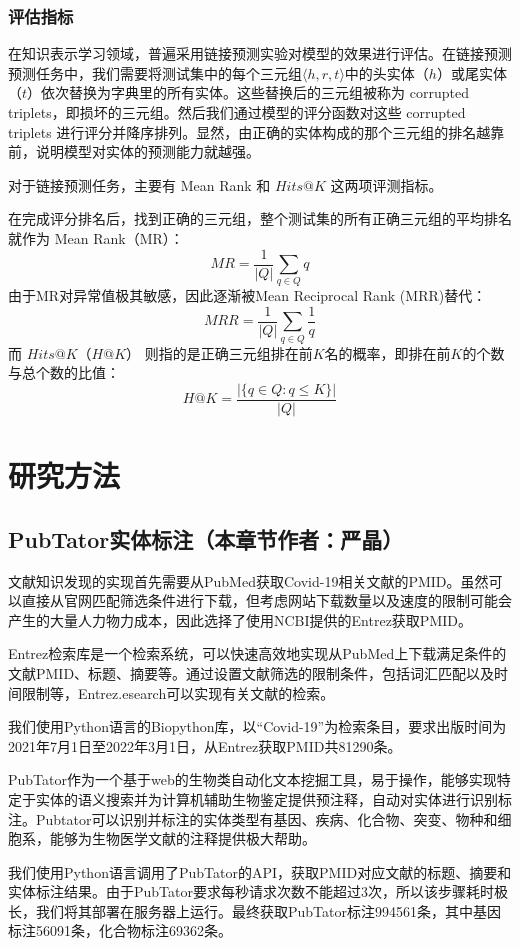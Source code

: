 \documentclass[twocolumn]{article}
\begin{document}
\subsubsection{评估指标}
在知识表示学习领域，普遍采用链接预测实验对模型的效果进行评估。在链接预测预测任务中，我们需要将测试集中的每个三元组$\langle h, r, t\rangle$中的头实体（$h$）或尾实体（$t$）依次替换为字典里的所有实体。这些替换后的三元组被称为 corrupted triplets，即损坏的三元组。然后我们通过模型的评分函数对这些 corrupted triplets 进行评分并降序排列。显然，由正确的实体构成的那个三元组的排名越靠前，说明模型对实体的预测能力就越强。\par
对于链接预测任务，主要有 Mean Rank 和 $Hits@K$ 这两项评测指标。\par
在完成评分排名后，找到正确的三元组，整个测试集的所有正确三元组的平均排名就作为 Mean Rank（MR）：
$$MR=\frac{1}{|Q|} \sum_{q \in Q} q$$
由于MR对异常值极其敏感，因此逐渐被Mean Reciprocal Rank (MRR)替代：
$$MRR=\frac{1}{|Q|} \sum_{q \in Q} \frac{1}{q}$$
而 $Hits@K$（$H@K$） 则指的是正确三元组排在前$K$名的概率，即排在前$K$的个数与总个数的比值：
$$H @ K=\frac{|\{q \in Q: q \leq K\}|}{|Q|}$$


\section{研究方法}

\subsection{PubTator实体标注（本章节作者：严晶）\label{data_access}}
文献知识发现的实现首先需要从PubMed获取Covid-19相关文献的PMID。虽然可以直接从官网匹配筛选条件进行下载，但考虑网站下载数量以及速度的限制可能会产生的大量人力物力成本，因此选择了使用NCBI提供的Entrez获取PMID。\par
Entrez检索库是一个检索系统，可以快速高效地实现从PubMed上下载满足条件的文献PMID、标题、摘要等。通过设置文献筛选的限制条件，包括词汇匹配以及时间限制等，Entrez.esearch可以实现有关文献的检索。\par
我们使用Python语言的Biopython库，以“Covid-19”为检索条目，要求出版时间为2021年7月1日至2022年3月1日，从Entrez获取PMID共81290条。\par
PubTator作为一个基于web的生物类自动化文本挖掘工具，易于操作，能够实现特定于实体的语义搜索并为计算机辅助生物鉴定提供预注释，自动对实体进行识别标注。Pubtator可以识别并标注的实体类型有基因、疾病、化合物、突变、物种和细胞系，能够为生物医学文献的注释提供极大帮助。\par
我们使用Python语言调用了PubTator的API，获取PMID对应文献的标题、摘要和实体标注结果。由于PubTator要求每秒请求次数不能超过3次，所以该步骤耗时极长，我们将其部署在服务器上运行。最终获取PubTator标注994561条，其中基因标注56091条，化合物标注69362条。\par
\end{document}
